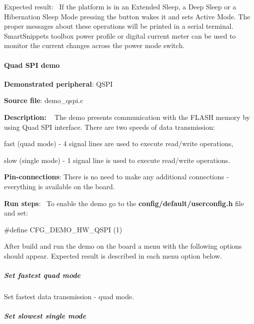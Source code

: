 Expected result\+:~\newline
 If the platform is in an Extended Sleep, a Deep Sleep or a Hibernation Sleep Mode pressing the button wakes it and sets Active Mode. The proper messages about these operations will be printed in a serial terminal. Smart\+Snippets toolbox power profile or digital current meter can be used to monitor the current changes across the power mode switch.

\paragraph*{Quad S\+P\+I demo}


\begin{DoxyItemize}
\item {\bfseries Demonstrated peripheral}\+: Q\+S\+P\+I
\item {\bfseries Source file}\+: demo\+\_\+qspi.\+c
\item {\bfseries Description\+:} ~\newline
 The demo presents communication with the F\+L\+A\+S\+H memory by using Quad S\+P\+I interface. There are two speeds of data transmission\+:
\begin{DoxyItemize}
\item fast (quad mode) -\/ 4 signal lines are used to execute read/write operations,
\item slow (single mode) -\/ 1 signal line is used to execute read/write operations.
\end{DoxyItemize}
\item {\bfseries Pin-\/connections}\+: There is no need to make any additional connections -\/ everything is available on the board.
\item {\bfseries Run steps}\+:~\newline
 To enable the demo go to the {\bfseries {\ttfamily config/default/userconfig.\+h}} file and set\+: 
\begin{DoxyCode}
\textcolor{preprocessor}{#define CFG\_DEMO\_HW\_QSPI        (1)}
\end{DoxyCode}
 After build and run the demo on the board a menu with the following options should appear. Expected result is described in each menu option below.
\end{DoxyItemize}

\subparagraph*{Set fastest quad mode}

Set fastest data transmission -\/ quad mode.

\subparagraph*{Set slowest single mode}

